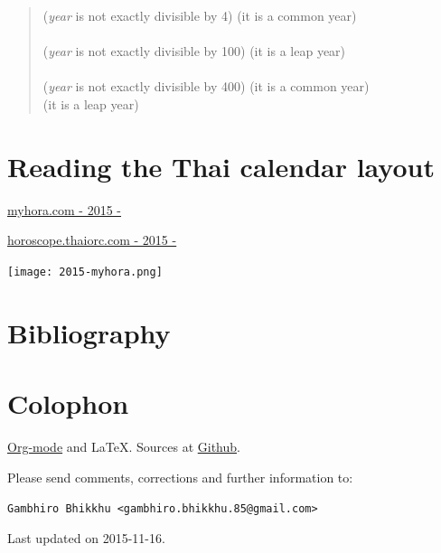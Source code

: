 \documentclass[11pt,oneside]{memoir-article}
\begin{document}
\begin{quote}
 (\emph{year} is not exactly divisible by 4)  (it is a common year)\\
\\
 (\emph{year} is not exactly divisible by 100)  (it is a leap year)\\
\\
 (\emph{year} is not exactly divisible by 400)  (it is a common year)\\
 (it is a leap year)
\autocite{wp-leap-year}
\end{quote}

\chapter{Reading the Thai calendar layout}
\label{sec-8}

\href{http://www.myhora.com/%E0%B8%9B%E0%B8%8F%E0%B8%B4%E0%B8%97%E0%B8%B4%E0%B8%99/%E0%B8%9B%E0%B8%8F%E0%B8%B4%E0%B8%97%E0%B8%B4%E0%B8%99-100%E0%B8%9B%E0%B8%B5-%E0%B8%9E.%E0%B8%A8.2558.aspx}{myhora.com - 2015 - \thai{ปฏิทิน 100 ปี 2558 ปฏิทินร้อยปี ปีมะแม}}

\href{http://horoscope.thaiorc.com/calendar/thaicalendar.php?y=2558}{horoscope.thaiorc.com - 2015 - }

\begin{fullwidth}
\centering
\texttt{[image: 2015-myhora.png]}
\end{fullwidth}

\chapter{Bibliography}
\label{sec-9}
\label{bibliography}

\printbibliography

\chapter{Colophon}
\label{sec-10}

\href{http://orgmode.org/}{Org-mode} and \LaTeX. Sources at \href{https://github.com/profound-labs/calculating-the-uposatha-moondays/}{Github}.

Please send comments, corrections and further information to:

\texttt{Gambhiro Bhikkhu <gambhiro.bhikkhu.85@gmail.com>}

Last updated on 2015-11-16.





\end{document}
